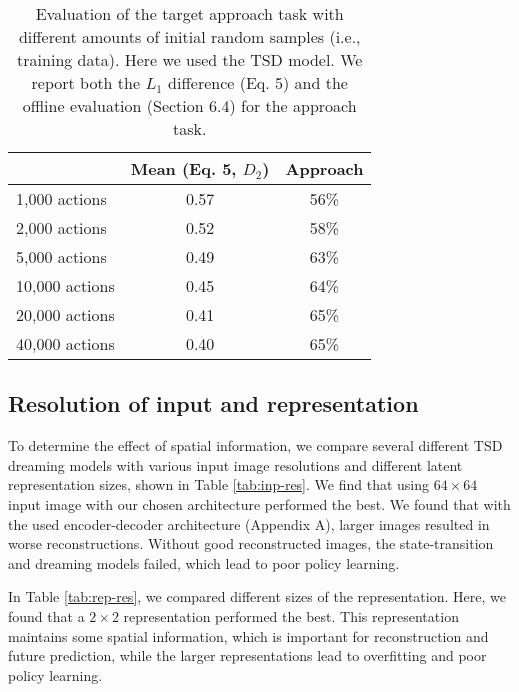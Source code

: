 \documentclass[letterpaper, 10 pt, conference]{ieeeconf}
\begin{document}
\begin{table}
\small
  \caption{Evaluation of the target approach task with different amounts of initial random samples (i.e., training data). Here we used the TSD model. We report both the $L_1$ difference (Eq. 5) and the offline evaluation (Section 6.4) for the approach task.}
  \label{tab:num-samples}
  \centering
  \begin{tabular}{lcc}
    \toprule
         &  Mean (Eq. 5, $D_2$)  &  Approach\\
    \midrule
    1,000 actions & 0.57 & 56\%\\
    2,000 actions & 0.52 & 58\%\\
    5,000 actions & 0.49 &  63\%\\
    10,000 actions & 0.45 & 64\%\\
    20,000 actions & 0.41 & 65\%\\ 
    40,000 actions & 0.40 & 65\%\\ 
    \bottomrule
  \end{tabular}
\end{table}\subsection{Resolution of input and representation}
To determine the effect of spatial information, we compare several different TSD dreaming models with various input image resolutions and different latent representation sizes, shown in Table \ref{tab:inp-res}. We find that using $64\times 64$ input image with our chosen architecture performed the best. We found that with the used encoder-decoder architecture (Appendix A), larger images resulted in worse reconstructions. Without good reconstructed images, the state-transition and dreaming models failed, which lead to poor policy learning. 

In Table \ref{tab:rep-res}, we compared different sizes of the representation. Here, we found that a $2\times 2$ representation performed the best. This representation maintains some spatial information, which is important for reconstruction and future prediction, while the larger representations lead to overfitting and poor policy learning.
\end{document}
